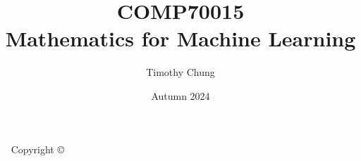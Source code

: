 \documentclass[a4paper,nofonts,notoc,oneside,openany,nobib]{tufte-book}
\title{COMP70015 \\Mathematics for Machine Learning}
\date{Autumn 2024}
\author[Timothy Chung]{Timothy Chung}
\newcommand{\monthyear}{%
  \ifcase\month\or January\or February\or March\or April\or May\or June\or
  July\or August\or September\or October\or November\or
  December\fi\space\number\year
}
\newcommand{\openepigraph}[2]{%
  \begin{fullwidth}
  \sffamily\large
  \begin{doublespace}
  \noindent\allcaps{#1}\\%
  \noindent\allcaps{#2}%
  \end{doublespace}
  \end{fullwidth}
}
\newcommand{\blankpage}{\newpage\hbox{}\thispagestyle{empty}\newpage}
\begin{document}
\frontmatter
\RaggedRight




\begin{fullwidth}
  \begin{raggedright}
    \maketitle
  \end{raggedright}
\end{fullwidth}


\newpage
\begin{fullwidth}
  ~\vfill
  \thispagestyle{empty}
  \setlength{\parindent}{0pt}
  \setlength{\parskip}{\baselineskip}
  Copyright \copyright\ \the\year\ \thanklessauthor




\end{fullwidth}
\end{document}
